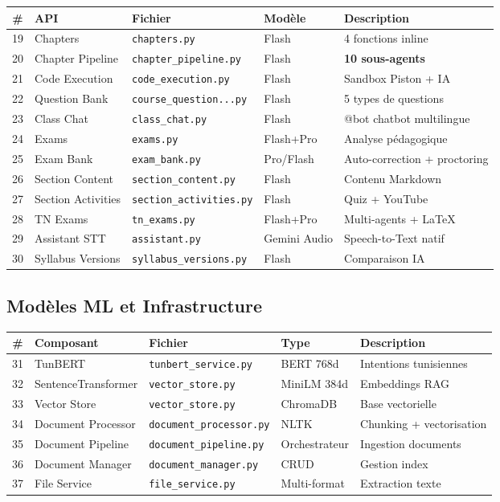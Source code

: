 \documentclass[12pt,a4paper]{article}
\begin{document}
\begin{longtable}{@{}clp{3cm}p{2cm}p{5cm}@{}}
\toprule
\textbf{\#} & \textbf{API} & \textbf{Fichier} & \textbf{Modèle} & \textbf{Description} \\
\midrule
\endhead
19 & Chapters & \texttt{chapters.py} & Flash & 4 fonctions inline \\
20 & Chapter Pipeline & \texttt{chapter\_pipeline.py} & Flash & \textbf{10 sous-agents} \\
21 & Code Execution & \texttt{code\_execution.py} & Flash & Sandbox Piston + IA \\
22 & Question Bank & \texttt{course\_question...py} & Flash & 5 types de questions \\
23 & Class Chat & \texttt{class\_chat.py} & Flash & @bot chatbot multilingue \\
24 & Exams & \texttt{exams.py} & Flash+Pro & Analyse pédagogique \\
25 & Exam Bank & \texttt{exam\_bank.py} & Pro/Flash & Auto-correction + proctoring \\
26 & Section Content & \texttt{section\_content.py} & Flash & Contenu Markdown \\
27 & Section Activities & \texttt{section\_activities.py} & Flash & Quiz + YouTube \\
28 & TN Exams & \texttt{tn\_exams.py} & Flash+Pro & Multi-agents + LaTeX \\
29 & Assistant STT & \texttt{assistant.py} & Gemini Audio & Speech-to-Text natif \\
30 & Syllabus Versions & \texttt{syllabus\_versions.py} & Flash & Comparaison IA \\
\bottomrule
\end{longtable}

\subsection{Modèles ML et Infrastructure}

\begin{longtable}{@{}clp{3cm}p{2cm}p{5cm}@{}}
\toprule
\textbf{\#} & \textbf{Composant} & \textbf{Fichier} & \textbf{Type} & \textbf{Description} \\
\midrule
\endhead
31 & TunBERT & \texttt{tunbert\_service.py} & BERT 768d & Intentions tunisiennes \\
32 & SentenceTransformer & \texttt{vector\_store.py} & MiniLM 384d & Embeddings RAG \\
33 & Vector Store & \texttt{vector\_store.py} & ChromaDB & Base vectorielle \\
34 & Document Processor & \texttt{document\_processor.py} & NLTK & Chunking + vectorisation \\
35 & Document Pipeline & \texttt{document\_pipeline.py} & Orchestrateur & Ingestion documents \\
36 & Document Manager & \texttt{document\_manager.py} & CRUD & Gestion index \\
37 & File Service & \texttt{file\_service.py} & Multi-format & Extraction texte \\
\bottomrule
\end{longtable}
\end{document}
